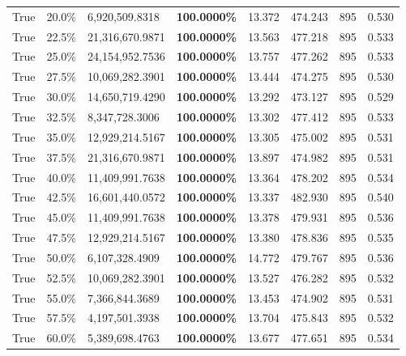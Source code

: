 \begin{table}[H]
\begin{tabular}{lllrllll}
\cline{1-8}
True & 20.0\% & 6,920,509.8318 & \bfseries \color{red} 100.0000\% & 13.372 & 474.243 & 895 & 0.530 \\
\cline{1-8}
True & 22.5\% & 21,316,670.9871 & \bfseries \color{red} 100.0000\% & 13.563 & 477.218 & 895 & 0.533 \\
\cline{1-8}
True & 25.0\% & 24,154,952.7536 & \bfseries \color{red} 100.0000\% & 13.757 & 477.262 & 895 & 0.533 \\
\cline{1-8}
True & 27.5\% & 10,069,282.3901 & \bfseries \color{red} 100.0000\% & 13.444 & 474.275 & 895 & 0.530 \\
\cline{1-8}
True & 30.0\% & 14,650,719.4290 & \bfseries \color{red} 100.0000\% & 13.292 & 473.127 & 895 & 0.529 \\
\cline{1-8}
True & 32.5\% & 8,347,728.3006 & \bfseries \color{red} 100.0000\% & 13.302 & 477.412 & 895 & 0.533 \\
\cline{1-8}
True & 35.0\% & 12,929,214.5167 & \bfseries \color{red} 100.0000\% & 13.305 & 475.002 & 895 & 0.531 \\
\cline{1-8}
True & 37.5\% & 21,316,670.9871 & \bfseries \color{red} 100.0000\% & 13.897 & 474.982 & 895 & 0.531 \\
\cline{1-8}
True & 40.0\% & 11,409,991.7638 & \bfseries \color{red} 100.0000\% & 13.364 & 478.202 & 895 & 0.534 \\
\cline{1-8}
True & 42.5\% & 16,601,440.0572 & \bfseries \color{red} 100.0000\% & 13.337 & 482.930 & 895 & 0.540 \\
\cline{1-8}
True & 45.0\% & 11,409,991.7638 & \bfseries \color{red} 100.0000\% & 13.378 & 479.931 & 895 & 0.536 \\
\cline{1-8}
True & 47.5\% & 12,929,214.5167 & \bfseries \color{red} 100.0000\% & 13.380 & 478.836 & 895 & 0.535 \\
\cline{1-8}
True & 50.0\% & 6,107,328.4909 & \bfseries \color{red} 100.0000\% & 14.772 & 479.767 & 895 & 0.536 \\
\cline{1-8}
True & 52.5\% & 10,069,282.3901 & \bfseries \color{red} 100.0000\% & 13.527 & 476.282 & 895 & 0.532 \\
\cline{1-8}
True & 55.0\% & 7,366,844.3689 & \bfseries \color{red} 100.0000\% & 13.453 & 474.902 & 895 & 0.531 \\
\cline{1-8}
True & 57.5\% & 4,197,501.3938 & \bfseries \color{red} 100.0000\% & 13.704 & 475.843 & 895 & 0.532 \\
\cline{1-8}
True & 60.0\% & 5,389,698.4763 & \bfseries \color{red} 100.0000\% & 13.677 & 477.651 & 895 & 0.534 \\

\end{tabular}
\end{table}
